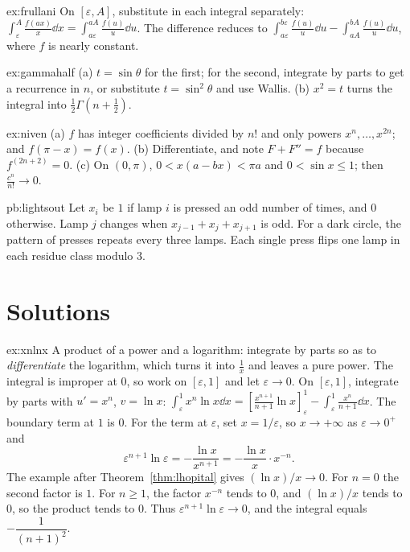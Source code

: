 \begin{hint}{ex:frullani}
On $[\varepsilon,A]$, substitute in each integral separately: $\int_\varepsilon^A\frac{f(ax)}x\dd x=\int_{a\varepsilon}^{aA}\frac{f(u)}u\dd u$. The difference reduces to $\int_{a\varepsilon}^{b\varepsilon}\frac{f(u)}u\dd u-\int_{aA}^{bA}\frac{f(u)}u\dd u$, where $f$ is nearly constant.
\end{hint}
\begin{hint}{ex:gammahalf}
(a) $t=\sin\theta$ for the first; for the second, integrate by parts to get a recurrence in $n$, or substitute $t=\sin^2\theta$ and use Wallis. (b) $x^2=t$ turns the integral into $\frac12\Gamma\left(n+\frac12\right)$.
\end{hint}
\begin{hint}{ex:niven}
(a) $f$ has integer coefficients divided by $n!$ and only powers $x^n,\dots,x^{2n}$; and $f(\pi-x)=f(x)$. (b) Differentiate, and note $F+F''=f$ because $f^{(2n+2)}=0$. (c) On $(0,\pi)$, $0<x(a-bx)<\pi a$ and $0<\sin x\le1$; then $\frac{c^n}{n!}\to0$.
\end{hint}
\begin{hint}{pb:lightsout}
Let $x_i$ be $1$ if lamp $i$ is pressed an odd number of times, and $0$ otherwise. Lamp $j$ changes when $x_{j-1}+x_j+x_{j+1}$ is odd. For a dark circle, the pattern of presses repeats every three lamps. Each single press flips one lamp in each residue class modulo $3$.
\end{hint}

\section{Solutions}
\begin{solution}{ex:xnlnx}
\idea A product of a power and a logarithm: integrate by parts so as to \emph{differentiate} the logarithm, which turns it into $\frac1x$ and leaves a pure power. The integral is improper at $0$, so work on $[\varepsilon,1]$ and let $\varepsilon\to0$.
\writeup On $[\varepsilon,1]$, integrate by parts with $u'=x^n$, $v=\ln x$:
$\int_\varepsilon^1x^n\ln x\dd x=\left[\frac{x^{n+1}}{n+1}\ln x\right]_\varepsilon^1-\int_\varepsilon^1\frac{x^n}{n+1}\dd x$.
The boundary term at $1$ is $0$. For the term at $\varepsilon$, set $x=1/\varepsilon$, so $x\to+\infty$ as $\varepsilon\to0^+$ and
\[
\varepsilon^{n+1}\ln\varepsilon=-\frac{\ln x}{x^{n+1}}=-\frac{\ln x}x\cdot x^{-n}.
\]
The example after Theorem~\ref{thm:lhopital} gives $(\ln x)/x\to0$. For $n=0$ the second factor is $1$. For $n\ge1$, the factor $x^{-n}$ tends to $0$, and $(\ln x)/x$ tends to $0$, so the product tends to $0$. Thus $\varepsilon^{n+1}\ln\varepsilon\to0$, and the integral equals $-\dfrac1{(n+1)^2}$.
\end{solution}

